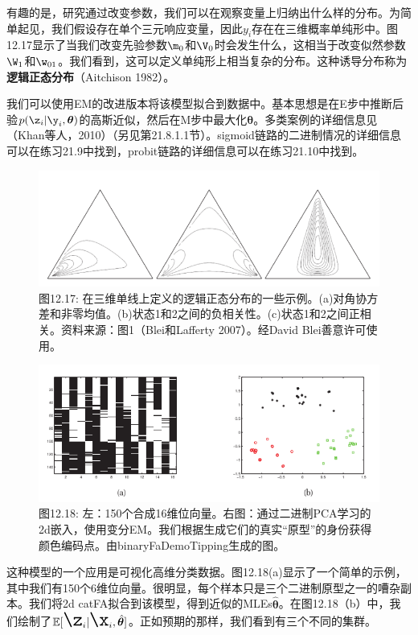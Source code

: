 \documentclass[a4paper]{article}
\begin{document}
有趣的是，研究通过改变参数，我们可以在观察变量上归纳出什么样的分布。为简单起见，我们假设存在单个三元响应变量，因此$y_i$存在在三维概率单纯形中。图12.17显示了当我们改变先验参数$\m_{0}$和$\V_0$时会发生什么，这相当于改变似然参数$\W_1$和$\w_{01}$。我们看到，这可以定义单纯形上相当复杂的分布。这种诱导分布称为\textbf{逻辑正态分布}（Aitchison 1982）。

我们可以使用EM的改进版本将该模型拟合到数据中。基本思想是在E步中推断后验$p(\z_i|\y_i,\boldsymbol{\theta})$的高斯近似，然后在M步中最大化$\boldsymbol{\theta}$。多类案例的详细信息见（Khan等人，2010）（另见第21.8.1.1节）。sigmoid链路的二进制情况的详细信息可以在练习21.9中找到，probit链路的详细信息可以在练习21.10中找到。

\begin{figure}[h]
	\centering
	\includegraphics[width=0.7\linewidth]{fig/figure17}
	\caption*{图12.17: 在三维单线上定义的逻辑正态分布的一些示例。(a)对角协方差和非零均值。(b)状态1和2之间的负相关性。(c)状态1和2之间正相关。资料来源：图1（Blei和Lafferty 2007）。经David Blei善意许可使用。}
\end{figure}

\begin{figure}[h]
	\centering
	\includegraphics[width=0.7\linewidth]{fig/figure18}
	\caption*{图12.18: 左：150个合成16维位向量。右图：通过二进制PCA学习的2d嵌入，使用变分EM。我们根据生成它们的真实“原型”的身份获得颜色编码点。由binaryFaDemoTipping生成的图。}
\end{figure}

这种模型的一个应用是可视化高维分类数据。图12.18(a)显示了一个简单的示例，其中我们有150个6维位向量。很明显，每个样本只是三个二进制原型之一的嘈杂副本。我们将2d catFA拟合到该模型，得到近似的MLEs$\hat{\boldsymbol{\theta}}$。在图12.18（b）中，我们绘制了$\mathbb{E}{\LARGE [\z_i|\x_i,\hat{\boldsymbol{\theta}}]}$。正如预期的那样，我们看到有三个不同的集群。 
\end{document}

